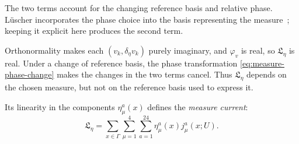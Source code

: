 \documentclass[11pt,a4paper]{article}
\theoremstyle{remark}
\begin{document}
The two terms account for the changing reference basis and
relative phase. L\"uscher incorporates the phase choice into
the basis representing the measure~\cite{LuscherNonabelian};
keeping it explicit here produces the second term.

Orthonormality makes each \((v_k,\delta_\eta v_k)\) purely
imaginary, and \(\varphi_v\) is real, so
\(\mathfrak L_\eta\) is real. Under a change of reference
basis, the phase transformation
\eqref{eq:measure-phase-change} makes the changes in the two
terms cancel. Thus \(\mathfrak L_\eta\) depends on the chosen measure,
but not on the reference basis used to express it.

Its linearity in the components \(\eta_\mu^a(x)\) defines
the \emph{measure current}:
\begin{equation}
 \mathfrak L_\eta
 =\sum_{x\in\Gamma}\sum_{\mu=1}^4\sum_{a=1}^{24}
       \eta_\mu^a(x)j_\mu^a(x;U).
 \label{eq:measure-term}
\end{equation}
\end{document}
